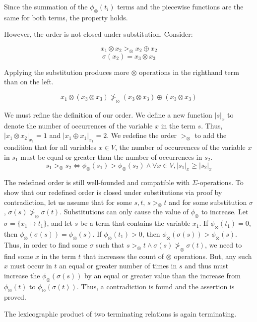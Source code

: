 \documentclass[sigplan,review,anonymous]{acmart}\settopmatter{printfolios=true,printccs=false,printacmref=false}
\begin{document}
Since the summation of the $\phi_\otimes(t_i)$ terms and the piecewise functions are the same for both terms, the property holds.

However, the order is not closed under substitution. Consider:

\[
x_1 \otimes x_2 >_\otimes x_2 \oplus x_2
\]
\[
\sigma(x_2) = x_3 \otimes x_3
\]

Applying the substitution produces more $\otimes$ operations in the righthand term than on the left.

\[
x_1 \otimes (x_3 \otimes x_3) \ngtr_\otimes (x_3 \otimes x_3) \oplus (x_3 \otimes x_3)
\]
 
We must refine the definition of our order. We define a new function $|s|_x$ to denote the number of occurrences of the variable $x$ in the term $s$. Thus, $|x_1 \otimes x_2|_{x_1} = 1$ and $|x_1 \oplus x_1|_{x_1} = 2$. We redefine the order $>_\otimes$ to add the condition that for all variables $x \in V$, the number of occurrences of the variable $x$ in $s_1$ must be equal or greater than the number of occurrences in $s_2$.
\[
s_1 >_\otimes s_2 \iff \phi_\otimes(s_1) > \phi_\otimes(s_2) \wedge \forall x \in V, |s_1|_x \geq |s_2|_x
\]

The redefined order is still well-founded and compatible with $\Sigma$-operations. To show that our redefined order is closed under substitutions via proof by contradiction, let us assume that for some $s, t$, $s >_\otimes t$ and for some substitution $\sigma$, $\sigma(s) \ngtr_\otimes \sigma(t)$. Substitutions can only cause the value of $\phi_\otimes$ to increase. Let $\sigma = \{x_1 \mapsto t_1\}$, and let $s$ be a term that contains the variable $x_1$. If $\phi_\otimes(t_1) = 0$, then $\phi_\otimes(\sigma(s)) = \phi_\otimes(s)$. If $\phi_\otimes(t_1) > 0$, then $\phi_\otimes(\sigma(s)) > \phi_\otimes(s)$. Thus, in order to find some $\sigma$ such that $s >_\otimes t \wedge \sigma(s) \ngtr_\otimes \sigma(t)$, we need to find some $x$ in the term $t$ that increases the count of $\otimes$ operations. But, any such $x$ must occur in $t$ an equal or greater number of times in $s$ and thus must increase the $\phi_\otimes(\sigma(s))$ by an equal or greater value than the increase from $\phi_\otimes(t)$ to $\phi_\otimes(\sigma(t))$. Thus, a contradiction is found and the assertion is proved.


\begin{theorem}
The lexicographic product of two terminating relations is again terminating.
\end{theorem}
\end{document}
